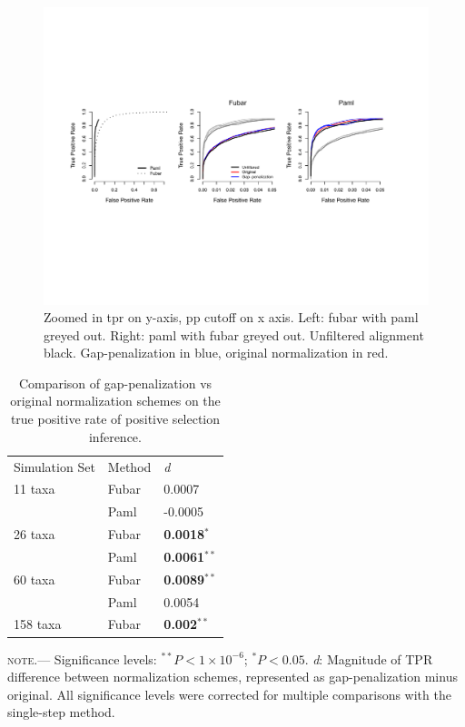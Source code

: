 \documentclass[10pt]{article}
\begin{document}
\begin{figure}
\centerline{\includegraphics[width=5in]{Figures/fulltpr.pdf}}
\caption{\label{subtpr} Zoomed in tpr on y-axis, pp cutoff on x axis. Left: fubar with paml greyed out. Right: paml with fubar greyed out. Unfiltered alignment black. Gap-penalization in blue, original normalization in red.}
\end{figure}



\begin{table}[H]
\caption {\label{tab:penalmodel} Comparison of gap-penalization vs original normalization schemes on the true positive rate of positive selection inference.}
\begin{tabular}{l l l}
\hline\noalign{\smallskip}
Simulation Set & Method & \textit{d} \\
\noalign{\smallskip}\hline\noalign{\smallskip}
11 taxa  & Fubar & 0.0007 \\
              & Paml & -0.0005\\
\hline
26 taxa   & Fubar & \textbf{0.0018}$^{\ast}$\\
              & Paml & \textbf{0.0061}$^{\ast\ast}$\\
\hline
60 taxa  & Fubar & \textbf{0.0089}$^{\ast\ast}$ \\
              & Paml & 0.0054  \\
\hline
158 taxa & Fubar & \textbf{0.002}$^{\ast\ast}$  \\
\hline
\end{tabular}
\newline
\textsc{note.}--- Significance levels: $^{\ast\ast} P < 1\times10^{-6}$; $^{\ast} P < 0.05$. \textit{d}: Magnitude of TPR difference between normalization schemes, represented as gap-penalization minus original. All significance levels were corrected for multiple comparisons with the single-step method.
\end{table}
\end{document}
